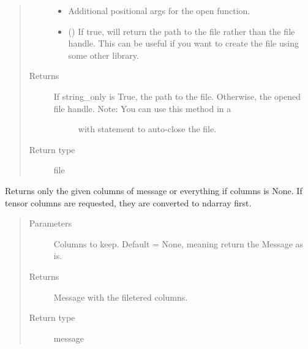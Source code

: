 \documentclass[letterpaper,10pt,english]{sphinxmanual}
\begin{document}
\begin{fulllineitems}
\begin{fulllineitems}
\begin{quote}
\begin{description}
\begin{itemize}
\item {} 
 \textendash{} Additional positional args for the open function.

\item {} 
 () \textendash{} If true, will return the path to the file rather than the file handle. This can be useful if you want to
create the file using some other library.

\end{itemize}

\item[{Returns}] \leavevmode
\begin{description}
\item[{If string\_only is True, the path to the file. Otherwise, the opened file handle. Note: You can use this method in a}] \leavevmode
with statement to auto-close the file.

\end{description}


\item[{Return type}] \leavevmode
file

\end{description}\end{quote}

\end{fulllineitems}


\end{fulllineitems}


\begin{fulllineitems}
\label{\detokenize{Fireworks:Fireworks.extensions.experiment.filter_columns}}
Returns only the given columns of message or everything if columns is None.
If tensor columns are requested, they are converted to ndarray first.
\begin{quote}\begin{description}
\item[{Parameters}] \leavevmode
{} \textendash{} Columns to keep. Default = None, meaning return the Message as is.

\item[{Returns}] \leavevmode
Message with the filetered columns.

\item[{Return type}] \leavevmode
message

\end{description}\end{quote}

\end{fulllineitems}
\end{document}
